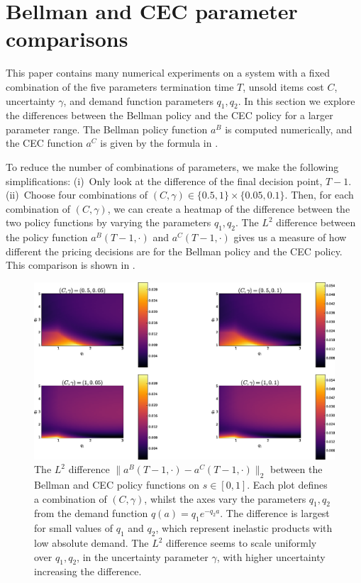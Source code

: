 \documentclass[main.tex]{subfiles}
\begin{document}
\listoftodos

\section{Bellman and CEC parameter comparisons}\label{sec:parameter_comparison}
This paper contains many numerical experiments on a system
with a fixed combination of the five parameters
termination time $T$, unsold items cost $C$, uncertainty $\gamma$, and
demand function parameters $q_1,q_2$.
In this section we explore the differences between the Bellman policy
and the CEC policy for a larger parameter range.
The Bellman policy function $a^B$ is computed numerically, and
the CEC function $a^C$ is given by the formula in
.

To reduce the number of combinations of parameters, we make the
following simplifications:
(i)~Only look at the difference of the final decision point, $T-1$.
(ii)~Choose four combinations of
$(C,\gamma)\in\{0.5,1\}\times\{0.05,0.1\}$.
Then,
for each combination of $(C,\gamma)$,
we can create a heatmap of the difference between the two policy
functions by varying the parameters $q_1,q_2$.
The $L^2$ difference between the
policy function $a^B(T-1,\cdot)$ and $a^C(T-1,\cdot)$
gives us a measure of how different the pricing decisions are for
the Bellman policy and the CEC policy.
This comparison is shown in .
\begin{figure}[htbp]
  \includegraphics[width=1\textwidth]{./img/policy_diff_heatmaps}
  \caption{The $L^2$ difference $\|a^B(T-1,\cdot)-a^C(T-1,\cdot)\|_2$
    between the Bellman and CEC policy functions on $s\in[0,1]$.
    Each plot defines a combination of $(C,\gamma)$, whilst
    the axes vary the parameters $q_1,q_2$ from the demand function
    $q(a)=q_1e^{-q_2a}$.
    The difference is largest for small values of $q_1$ and $q_2$,
    which represent inelastic products with low absolute demand.
    The $L^2$ difference seems to scale uniformly over $q_1,q_2$, in the uncertainty
    parameter $\gamma$, with higher uncertainty increasing the
    difference.
  }\label{fig:policy_diff_heatmaps}
\end{figure}
\end{document}

